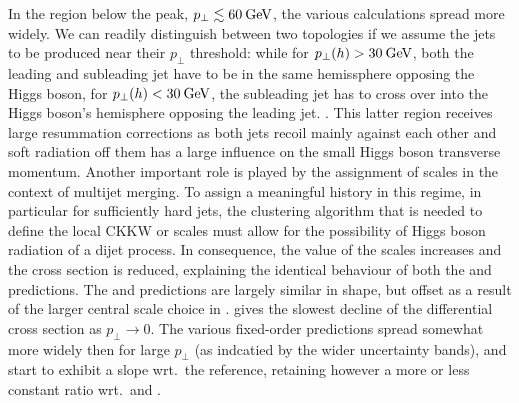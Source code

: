 In the region below the peak, $p_\perp\lesssim 60\text{\:GeV}$, the various
calculations spread more widely. We can readily distinguish between
two topologies if we assume the jets to be produced near their
$p_\perp$ threshold: while for $p_\perp(h)>30\text{\:GeV}$, both the leading
and subleading jet have to be in the same hemissphere opposing the
Higgs boson, for $p_\perp(h)<30\text{\:GeV}$, the subleading jet has to cross
over into the Higgs boson's hemisphere opposing the leading jet.
.
This latter region
receives large resummation corrections as both jets recoil mainly against 
each other and soft radiation off them has a large influence on the 
small Higgs boson transverse momentum. Another important role is
played by the assignment of scales in the context of multijet merging.
To assign a meaningful history in this regime, in particular for
sufficiently hard jets, the clustering algorithm that is needed to
define the local CKKW or \Minlo scales must allow for the possibility
of Higgs boson radiation of a dijet process. In consequence, the value
of the scales increases and the cross section is reduced, explaining
the identical behaviour of both the \Sherpa \MEPSatNLO and \Sherpa
\NNLOPS predictions. 
The \Herwig and \MGaMC predictions are largely similar in shape, but
offset as a result of the larger central scale choice in \MGaMC.
\Powheg \NNLOPS gives the slowest decline of the differential cross
section as $p_\perp\to0$.
The various fixed-order predictions spread somewhat more widely then
for large $p_\perp$ (as indcatied by the wider uncertainty bands), and 
start to exhibit a slope wrt.~the \Powheg reference, retaining however
a more or less constant ratio wrt.~\Herwig and \MGaMC.

